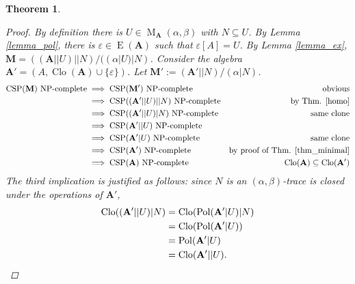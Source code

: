 \documentclass{amsart}
\theoremstyle{plain}
\newtheorem{theorem}{Theorem}[section]
\theoremstyle{definition}
\theoremstyle{remark}
\def\epsilon{\varepsilon}
\DeclareMathOperator{\Clo}{Clo}
\DeclareMathOperator{\CSP}{CSP}
\DeclareMathOperator{\Pol}{Pol}
\DeclareMathOperator{\NP}{NP}
\DeclareMathOperator{\Id}{E}
\DeclareMathOperator{\M}{M}
\begin{document}
\begin{theorem}
\begin{proof}
        By definition there is $U \in \M_\mathbf{A}(\alpha, \beta)$ with $N \subseteq U$. 
        By Lemma \ref{lemma_pol}, there is $\epsilon \in \Id(\mathbf{A})$ such that $\epsilon[A]=U$. 
        By Lemma \ref{lemma_ex}, $\mathbf{M}= ((\mathbf{A}||U)||N)/((\alpha|U)|N)$. 
        Consider the algebra $\mathbf{A}'=(A, \Clo(\mathbf{A}) \cup \{\epsilon\})$. 
        Let $\mathbf{M}':=(\mathbf{A}'||N)/(\alpha|N)$. 
        \begin{align*}
            \text{$\CSP(\mathbf{M})$ $\NP$-complete} & \implies \text{$\CSP(\mathbf{M}')$ $\NP$-complete} & \text{obvious}\\
            & \implies \text{$\CSP((\mathbf{A}'||U)||N)$ $\NP$-complete} & \text{by Thm. \ref{homo}}\\
            & \implies \text{$\CSP((\mathbf{A}'||U)|N)$ $\NP$-complete} & \text{same clone} \\
            & \implies \text{$\CSP(\mathbf{A}'||U)$ $\NP$-complete} & \text{}\\
            & \implies \text{$\CSP(\mathbf{A}'|U)$ $\NP$-complete} & \text{same clone}\\
            & \implies \text{$\CSP(\mathbf{A}')$ $\NP$-complete}  & \text{by proof of Thm. \ref{thm_minimal}}\\
            & \implies \text{$\CSP(\mathbf{A})$ $\NP$-complete} & \text{$\Clo(\mathbf{A}) \subseteq \Clo(\mathbf{A}')$}\\
        \end{align*}
        The third implication is justified as follows: since $N$ is an $(\alpha,\beta)$-trace is closed under the operations of $\mathbf{A}'$, 
        \begin{align*}
            \Clo((\mathbf{A}'||U)|N) & = \Clo(\Pol(\mathbf{A}'|U)|N) \\
            & = \Clo(\Pol(\mathbf{A}'|U)) \\
            & = \Pol(\mathbf{A}'|U) \\
            & = \Clo(\mathbf{A}'||U) \text{.} \qedhere
        \end{align*}
    \end{proof}
\end{theorem}
\end{document}
